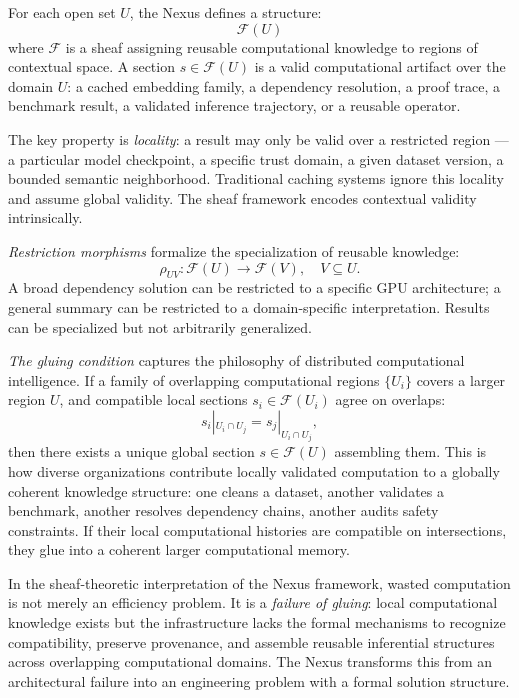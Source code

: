 For each open set $U$, the Nexus defines a structure:
\[
  \mathcal{F}(U)
\]
where $\mathcal{F}$ is a sheaf assigning reusable
computational knowledge to regions of contextual space.
A section $s \in \mathcal{F}(U)$ is a valid computational
artifact over the domain $U$: a cached embedding family,
a dependency resolution, a proof trace, a benchmark
result, a validated inference trajectory, or a reusable
operator.

The key property is \emph{locality}: a result may
only be valid over a restricted region --- a particular
model checkpoint, a specific trust domain, a given
dataset version, a bounded semantic neighborhood.
Traditional caching systems ignore this locality and
assume global validity. The sheaf framework encodes
contextual validity intrinsically.

\textit{Restriction morphisms} formalize the
specialization of reusable knowledge:
\[
  \rho_{UV} : \mathcal{F}(U) \to \mathcal{F}(V),
  \quad V \subseteq U.
\]
A broad dependency solution can be restricted to a
specific GPU architecture; a general summary can be
restricted to a domain-specific interpretation. Results
can be specialized but not arbitrarily generalized.

\textit{The gluing condition} captures the philosophy
of distributed computational intelligence. If a family
of overlapping computational regions $\{U_i\}$ covers
a larger region $U$, and compatible local sections
$s_i \in \mathcal{F}(U_i)$ agree on overlaps:
\[
  s_i|_{U_i \cap U_j} = s_j|_{U_i \cap U_j},
\]
then there exists a unique global section $s \in
\mathcal{F}(U)$ assembling them. This is how diverse
organizations contribute locally validated computation
to a globally coherent knowledge structure: one cleans
a dataset, another validates a benchmark, another
resolves dependency chains, another audits safety
constraints. If their local computational histories
are compatible on intersections, they glue into a
coherent larger computational memory.

\begin{auditprop}
\label{ap:sheaf-wasted-compute}
In the sheaf-theoretic interpretation of the Nexus
framework, wasted computation is not merely an
efficiency problem. It is a \emph{failure of gluing}:
local computational knowledge exists but the infrastructure
lacks the formal mechanisms to recognize compatibility,
preserve provenance, and assemble reusable inferential
structures across overlapping computational domains.
The Nexus transforms this from an architectural failure
into an engineering problem with a formal solution
structure.
\end{auditprop}


